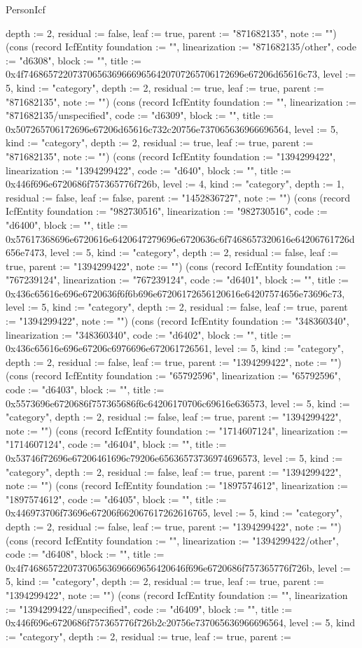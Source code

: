 \begin{lexlean}{PersonIcf}
\begin{semanticmodule}
{depth := 2, residual := false, leaf := true, parent := "871682135", note := ""}) (cons (record IcfEntity {foundation := "", linearization := "871682135/other", code := "d6308", block := "", title := 0x4f746865722073706563696669656420707265706172696e67206d65616c73, level := 5, kind := "category", depth := 2, residual := true, leaf := true, parent := "871682135", note := ""}) (cons (record IcfEntity {foundation := "", linearization := "871682135/unspecified", code := "d6309", block := "", title := 0x507265706172696e67206d65616c732c20756e737065636966696564, level := 5, kind := "category", depth := 2, residual := true, leaf := true, parent := "871682135", note := ""}) (cons (record IcfEntity {foundation := "1394299422", linearization := "1394299422", code := "d640", block := "", title := 0x446f696e6720686f757365776f726b, level := 4, kind := "category", depth := 1, residual := false, leaf := false, parent := "1452836727", note := ""}) (cons (record IcfEntity {foundation := "982730516", linearization := "982730516", code := "d6400", block := "", title := 0x57617368696e6720616e6420647279696e6720636c6f7468657320616e64206761726d656e7473, level := 5, kind := "category", depth := 2, residual := false, leaf := true, parent := "1394299422", note := ""}) (cons (record IcfEntity {foundation := "767239124", linearization := "767239124", code := "d6401", block := "", title := 0x436c65616e696e6720636f6f6b696e67206172656120616e64207574656e73696c73, level := 5, kind := "category", depth := 2, residual := false, leaf := true, parent := "1394299422", note := ""}) (cons (record IcfEntity {foundation := "348360340", linearization := "348360340", code := "d6402", block := "", title := 0x436c65616e696e67206c6976696e672061726561, level := 5, kind := "category", depth := 2, residual := false, leaf := true, parent := "1394299422", note := ""}) (cons (record IcfEntity {foundation := "65792596", linearization := "65792596", code := "d6403", block := "", title := 0x5573696e6720686f757365686f6c64206170706c69616e636573, level := 5, kind := "category", depth := 2, residual := false, leaf := true, parent := "1394299422", note := ""}) (cons (record IcfEntity {foundation := "1714607124", linearization := "1714607124", code := "d6404", block := "", title := 0x53746f72696e67206461696c79206e65636573736974696573, level := 5, kind := "category", depth := 2, residual := false, leaf := true, parent := "1394299422", note := ""}) (cons (record IcfEntity {foundation := "1897574612", linearization := "1897574612", code := "d6405", block := "", title := 0x446973706f73696e67206f662067617262616765, level := 5, kind := "category", depth := 2, residual := false, leaf := true, parent := "1394299422", note := ""}) (cons (record IcfEntity {foundation := "", linearization := "1394299422/other", code := "d6408", block := "", title := 0x4f746865722073706563696669656420646f696e6720686f757365776f726b, level := 5, kind := "category", depth := 2, residual := true, leaf := true, parent := "1394299422", note := ""}) (cons (record IcfEntity {foundation := "", linearization := "1394299422/unspecified", code := "d6409", block := "", title := 0x446f696e6720686f757365776f726b2c20756e737065636966696564, level := 5, kind := "category", depth := 2, residual := true, leaf := true, parent := }
\end{semanticmodule}
\end{lexlean}
